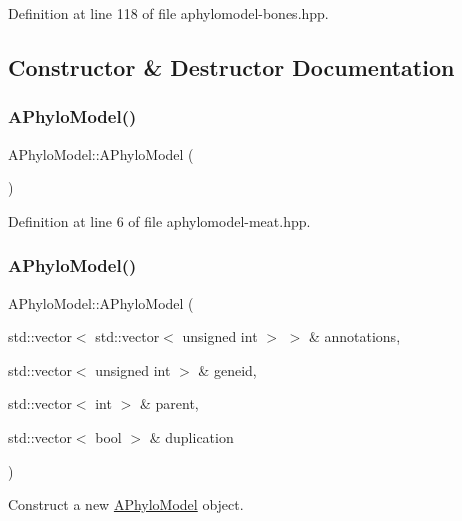 Definition at line 118 of file aphylomodel-\/bones.\+hpp.



\subsection{Constructor \& Destructor Documentation}
\mbox{\label{class_a_phylo_model_a5055699d05235bbefb283298d9dee75d}} 
\subsubsection{\texorpdfstring{A\+Phylo\+Model()}{APhyloModel()}\hspace{0.1cm}{\footnotesize\ttfamily [1/2]}}
{\footnotesize\ttfamily A\+Phylo\+Model\+::\+A\+Phylo\+Model (\begin{DoxyParamCaption}{ }\end{DoxyParamCaption})}



Definition at line 6 of file aphylomodel-\/meat.\+hpp.

\mbox{\label{class_a_phylo_model_a4c0005c106a12f1b11ccd9f5ceac8d9c}} 
\subsubsection{\texorpdfstring{A\+Phylo\+Model()}{APhyloModel()}\hspace{0.1cm}{\footnotesize\ttfamily [2/2]}}
{\footnotesize\ttfamily A\+Phylo\+Model\+::\+A\+Phylo\+Model (\begin{DoxyParamCaption}\item[{std\+::vector$<$ std\+::vector$<$ unsigned int $>$ $>$ \&}]{annotations,  }\item[{std\+::vector$<$ unsigned int $>$ \&}]{geneid,  }\item[{std\+::vector$<$ int $>$ \&}]{parent,  }\item[{std\+::vector$<$ bool $>$ \&}]{duplication }\end{DoxyParamCaption})}



Construct a new \hyperlink{class_a_phylo_model}{A\+Phylo\+Model} object. 

